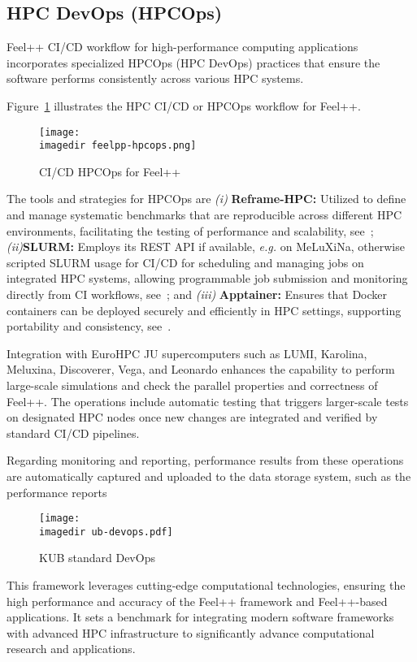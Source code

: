 \documentclass[runningheads]{llncs}
\newcommand{\imagedir}{./} %
\begin{document}
\subsection{HPC DevOps (HPCOps)}
Feel++ CI/CD workflow for high-performance computing applications incorporates specialized HPCOps (HPC DevOps) practices that ensure the software performs consistently across various HPC systems. 


Figure~\ref{fig:feelpp-hpcops} illustrates the HPC CI/CD or HPCOps workflow for Feel++. 
\begin{figure}
    \centering
    \texttt{[image: \\imagedir feelpp-hpcops.png]}
    \caption{CI/CD HPCOps for Feel++}
    \label{fig:feelpp-hpcops}
\end{figure}

The tools and strategies for HPCOps are  \textit{(i) }\textbf{Reframe-HPC:} Utilized to define and manage systematic benchmarks that are reproducible across different HPC environments, facilitating the testing of performance and scalability, see~\cite{karakasis_reframe-hpcreframe_2024};
\textit{(ii)}\textbf{SLURM:} Employs its REST API if available, \textit{e.g.} on MeLuXiNa, otherwise scripted SLURM usage for CI/CD for scheduling and managing jobs on integrated HPC systems, allowing programmable job submission and monitoring directly from CI workflows, see~\cite{slurm_development_team_slurm_2024}; and \textit{(iii)} \textbf{Apptainer:} Ensures that Docker containers can be deployed securely and efficiently in HPC settings, supporting portability and consistency, see~\cite{apptainer_contributors_apptainer_2024}.

Integration with EuroHPC JU supercomputers such as LUMI, Karolina, Meluxina, Discoverer, Vega, and Leonardo enhances the capability to perform large-scale simulations and check the parallel properties and correctness of Feel++. The operations include automatic testing that triggers larger-scale tests on designated HPC nodes once new changes are integrated and verified by standard CI/CD pipelines.

Regarding monitoring and reporting, performance results from these operations are automatically captured and uploaded to the data storage system, such as the performance reports 

\begin{wrapfigure}{R}{.7\linewidth}
    \centering
    \texttt{[image: \\imagedir ub-devops.pdf]}
    \caption{KUB standard DevOps}
    \label{fig:kub-devops}
\end{wrapfigure}
This framework leverages cutting-edge computational technologies, ensuring the high performance and accuracy of the Feel++ framework and Feel++-based applications. 
It sets a benchmark for integrating modern software frameworks with advanced HPC infrastructure to significantly advance computational research and applications.
\end{document}
